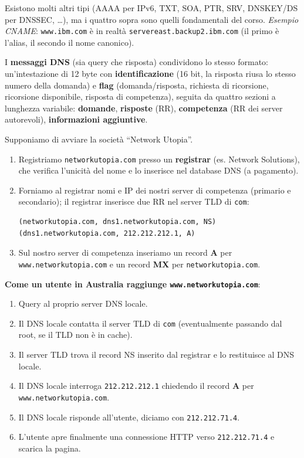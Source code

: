 \documentclass[12pt, a4paper]{article}
\begin{document}
Esistono molti altri tipi (AAAA per IPv6, TXT, SOA, PTR, SRV, DNSKEY/DS per DNSSEC, \dots), ma i quattro sopra sono quelli fondamentali del corso. \textit{Esempio CNAME}: \texttt{www.ibm.com} è in realtà \texttt{servereast.backup2.ibm.com} (il primo è l'alias, il secondo il nome canonico).

I \textbf{messaggi DNS} (sia query che risposta) condividono lo stesso formato: un'intestazione di 12 byte con \textbf{identificazione} (16 bit, la risposta riusa lo stesso numero della domanda) e \textbf{flag} (domanda/risposta, richiesta di ricorsione, ricorsione disponibile, risposta di competenza), seguita da quattro sezioni a lunghezza variabile: \textbf{domande}, \textbf{risposte} (RR), \textbf{competenza} (RR dei server autorevoli), \textbf{informazioni aggiuntive}.

\begin{tcolorbox}[colback=orange!5, colframe=orange!70!black, title=\textbf{Esempio pratico 2.5 -- Registrare un dominio e risolverlo}]
Supponiamo di avviare la società ``Network Utopia''.
\begin{enumerate}
    \item Registriamo \texttt{networkutopia.com} presso un \textbf{registrar} (es. Network Solutions), che verifica l'unicità del nome e lo inserisce nel database DNS (a pagamento).
    \item Forniamo al registrar nomi e IP dei nostri server di competenza (primario e secondario); il registrar inserisce due RR nel server TLD di \texttt{com}:
\begin{verbatim}
(networkutopia.com, dns1.networkutopia.com, NS)
(dns1.networkutopia.com, 212.212.212.1, A)
\end{verbatim}
    \item Sul nostro server di competenza inseriamo un record \textbf{A} per \texttt{www.networkutopia.com} e un record \textbf{MX} per \texttt{networkutopia.com}.
\end{enumerate}

\textbf{Come un utente in Australia raggiunge \texttt{www.networkutopia.com}}:
\begin{enumerate}
    \item Query al proprio server DNS locale.
    \item Il DNS locale contatta il server TLD di \texttt{com} (eventualmente passando dal root, se il TLD non è in cache).
    \item Il server TLD trova il record NS inserito dal registrar e lo restituisce al DNS locale.
    \item Il DNS locale interroga \texttt{212.212.212.1} chiedendo il record \textbf{A} per \texttt{www.networkutopia.com}.
    \item Il DNS locale risponde all'utente, diciamo con \texttt{212.212.71.4}.
    \item L'utente apre finalmente una connessione HTTP verso \texttt{212.212.71.4} e scarica la pagina.
\end{enumerate}
\end{tcolorbox}
\end{document}
